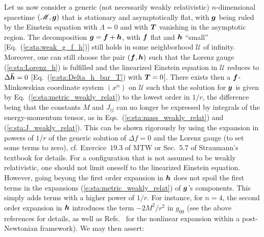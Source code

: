 Let us now consider a generic (not necessarily weakly relativistic) $n$-dimensional spacetime
$(\mathscr{M},\bm{g})$ that is stationary and asymptotically flat, with $\bm{g}$
being ruled by the Einstein equation with $\Lambda=0$ and with $\bm{T}$ vanishing in the
asymptotic region.
The decomposition $\bm{g} = \bm{f} + \bm{h}$, with $\bm{f}$ flat and $\bm{h}$ ``small''
[Eq.~(\ref{e:sta:weak_g_f_h})] still holds in some neighborhood $\mathscr{U}$ of infinity.
Moreover, one can still choose the pair $(\bm{f},\bm{h})$ such that
the Lorenz gauge (\ref{e:sta:Lorenz_h}) is fulfilled and
the linearized Einstein equation in $\mathscr{U}$ reduces to $\Delta \bm{\bar{h}} = 0$
[Eq.~(\ref{e:sta:Delta_h_bar_T}) with $\bm{T} = 0$].
There exists then a $\bm{f}$-Minkowskian coordinate system $(x^\alpha)$ on $\mathscr{U}$
such that the solution for $\bm{g}$ is given
by Eq.~(\ref{e:sta:metric_weakly_relat}) to the lowest order in $1/r$,
the difference being that the constants
$M$ and $J_{ij}$ can no longer be expressed by integrals of the energy-momentum
tensor, as in Eqs.~(\ref{e:sta:mass_weakly_relat}) and (\ref{e:sta:J_weakly_relat}).
This can be shown rigorously by using the expansion in powers of $1/r$ of
the generic solution of $\Delta f = 0$ and the Lorenz
gauge (to set some terms to zero), cf. Exercice~19.3 of MTW \cite{MisneTW73}
or Sec.~5.7 of Straumann's textbook \cite{Strau13} for details.
For a configuration that is not assumed to be weakly relativistic, one
should not limit oneself to the linearized Einstein equation.
However, going beyong the first order expansion in $\bm{h}$
does not spoil the first terms in the expansions (\ref{e:sta:metric_weakly_relat}) of
$\bm{g}$'s components. This simply adds terms with a higher power
of $1/r$. For instance, for $n=4$, the second order expansion in $\bm{h}$ introduces
the term $-2M^2/r^2$ in $g_{00}$ (see the above references for details, as well
as Refs.~\cite{Blanc24,PoissW14} for the nonlinear expansion within a post-Newtonian framework).
We may then assert:


